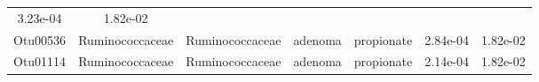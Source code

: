 \documentclass[11pt,]{article}
\begin{document}
\begin{longtable}[]{@{}ccccccc@{}}
\begin{minipage}[t]{0.09\columnwidth}
3.23e-04\strut
\end{minipage} & \begin{minipage}[t]{0.09\columnwidth}\centering\strut
1.82e-02\strut
\end{minipage}\tabularnewline
\begin{minipage}[t]{0.09\columnwidth}\centering\strut
Otu00536\strut
\end{minipage} & \begin{minipage}[t]{0.17\columnwidth}\centering\strut
Ruminococcaceae\strut
\end{minipage} & \begin{minipage}[t]{0.17\columnwidth}\centering\strut
Ruminococcaceae\strut
\end{minipage} & \begin{minipage}[t]{0.09\columnwidth}\centering\strut
adenoma\strut
\end{minipage} & \begin{minipage}[t]{0.11\columnwidth}\centering\strut
propionate\strut
\end{minipage} & \begin{minipage}[t]{0.09\columnwidth}\centering\strut
2.84e-04\strut
\end{minipage} & \begin{minipage}[t]{0.09\columnwidth}\centering\strut
1.82e-02\strut
\end{minipage}\tabularnewline
\begin{minipage}[t]{0.09\columnwidth}\centering\strut
Otu01114\strut
\end{minipage} & \begin{minipage}[t]{0.17\columnwidth}\centering\strut
Ruminococcaceae\strut
\end{minipage} & \begin{minipage}[t]{0.17\columnwidth}\centering\strut
Ruminococcaceae\strut
\end{minipage} & \begin{minipage}[t]{0.09\columnwidth}\centering\strut
adenoma\strut
\end{minipage} & \begin{minipage}[t]{0.11\columnwidth}\centering\strut
propionate\strut
\end{minipage} & \begin{minipage}[t]{0.09\columnwidth}\centering\strut
2.14e-04\strut
\end{minipage} & \begin{minipage}[t]{0.09\columnwidth}\centering\strut
1.82e-02\strut
\end{minipage}\tabularnewline

\end{longtable}
\end{document}
